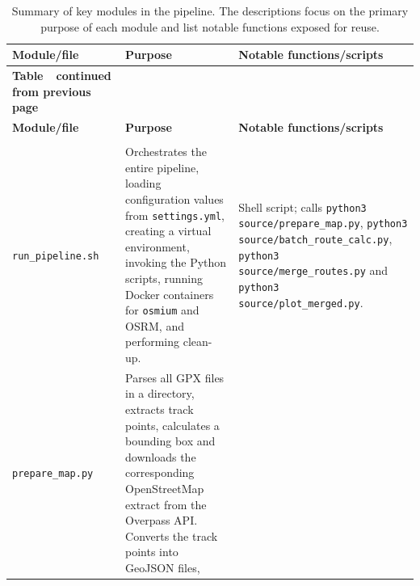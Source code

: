 \documentclass[11pt,a4paper]{article}
\begin{document}
\begin{longtable}{
	@{}
	>{\scriptsize\raggedright\arraybackslash}p{3cm}   %
	p{8cm}                                             %
	>{\scriptsize\RaggedRight\arraybackslash}p{4cm}               %
	@{}
	}
	\caption{\footnotesize Summary of key modules in the pipeline.  The descriptions focus on
		the primary purpose of each module and list notable functions exposed for
	reuse.\label{tab:modules}}                                                                                                                                                  \\
	\toprule
	\textbf{Module/file}                                                     & \textbf{Purpose}                                            & \textbf{Notable functions/scripts} \\
	\midrule
	\endfirsthead
	\multicolumn{3}{c}%
	{{\bfseries Table~\thetable\ continued from previous page}}                                                                                                                 \\
	\toprule
	\textbf{Module/file}                                                     & \textbf{Purpose}                                            & \textbf{Notable functions/scripts} \\
	\midrule
	\endhead
	\midrule \multicolumn{3}{r}{\emph{Continued on next page}}                                                                                                                  \\
	\endfoot
	\bottomrule
	\endlastfoot	\texttt{run\_pipeline.sh}                                   & Orchestrates the entire pipeline, loading
	configuration values from \texttt{settings.yml}, creating a virtual
	environment, invoking the Python scripts, running Docker containers for
	\texttt{osmium} and OSRM, and performing clean-up.                       & Shell script; calls
	\texttt{python3 source/prepare\_map.py}, \texttt{python3
		source/batch\_route\_calc.py}, \texttt{python3 source/merge\_routes.py} and
	\texttt{python3 source/plot\_merged.py}.                                                                                                                                    \\
	\texttt{prepare\_map.py}                                                 & Parses all GPX files in a directory, extracts track points,
	calculates a bounding box and downloads the corresponding OpenStreetMap extract
	from the Overpass API.  Converts the track points into GeoJSON files,

\end{longtable}
\end{document}
